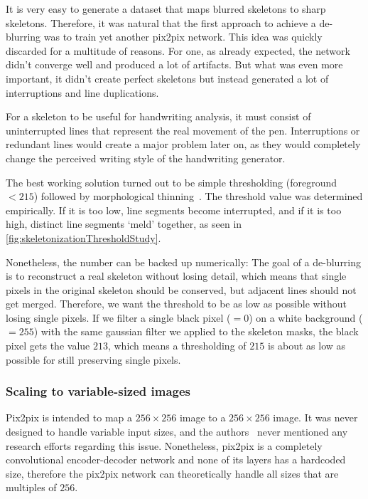 It is very easy to generate a dataset that maps blurred skeletons to sharp skeletons. Therefore, it was natural that the first approach to achieve a de-blurring was to train yet another pix2pix network. This idea was quickly discarded for a multitude of reasons.
For one, as already expected, the network didn't converge well and produced a lot of artifacts. But what was even more important, it didn't create perfect skeletons but instead generated a lot of interruptions and line duplications.

For a skeleton to be useful for handwriting analysis, it must consist of uninterrupted lines that represent the real movement of the pen. Interruptions or redundant lines would create a major problem later on, as they would completely change the perceived writing style of the handwriting generator.

The best working solution turned out to be simple thresholding (foreground $< 215$) followed by morphological thinning~\cite{thinning}.
The threshold value was determined empirically. If it is too low, line segments become interrupted, and if it is too high, distinct line segments `meld' together, as seen in \cref{fig:skeletonizationThresholdStudy}.



Nonetheless, the number can be backed up numerically: The goal of a de-blurring is to reconstruct a real skeleton without losing detail, which means that single pixels in the original skeleton should be conserved, but adjacent lines should not get merged. Therefore, we want the threshold to be as low as possible without losing single pixels.
If we filter a single black pixel ($=0$) on a white background ($=255$) with the same gaussian filter we applied to the skeleton masks, the black pixel gets the value $213$, which means a thresholding of $215$ is about as low as possible for still preserving single pixels.

\subsubsection{Scaling to variable-sized images}

Pix2pix is intended to map a $256\times256$ image to a $256\times256$ image. It was never designed to handle variable input sizes, and the authors~\cite{pix2pix} never mentioned any research efforts regarding this issue. Nonetheless, \gls{pix2pix} is a completely convolutional encoder-decoder network and none of its layers has a hardcoded size, therefore the \gls{pix2pix} network can theoretically handle all sizes that are multiples of $256$.

